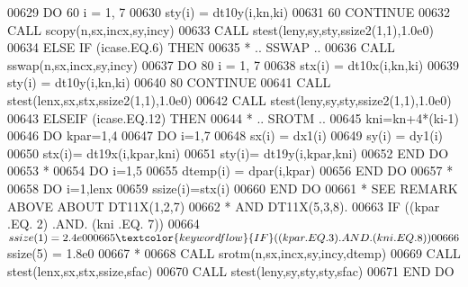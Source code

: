 \begin{DoxyCode}
00629                \textcolor{keywordflow}{DO} 60 i = 1, 7
00630                   sty(i) = dt10y(i,kn,ki)
00631    60          \textcolor{keywordflow}{CONTINUE}
00632                \textcolor{keyword}{CALL }scopy(n,sx,incx,sy,incy)
00633                \textcolor{keyword}{CALL }stest(leny,sy,sty,ssize2(1,1),1.0e0)
00634             \textcolor{keywordflow}{ELSE} \textcolor{keywordflow}{IF} (icase.EQ.6) \textcolor{keywordflow}{THEN}
00635 \textcolor{comment}{*              .. SSWAP ..}
00636                \textcolor{keyword}{CALL }sswap(n,sx,incx,sy,incy)
00637                \textcolor{keywordflow}{DO} 80 i = 1, 7
00638                   stx(i) = dt10x(i,kn,ki)
00639                   sty(i) = dt10y(i,kn,ki)
00640    80          \textcolor{keywordflow}{CONTINUE}
00641                \textcolor{keyword}{CALL }stest(lenx,sx,stx,ssize2(1,1),1.0e0)
00642                \textcolor{keyword}{CALL }stest(leny,sy,sty,ssize2(1,1),1.0e0)
00643             \textcolor{keywordflow}{ELSEIF} (icase.EQ.12) \textcolor{keywordflow}{THEN}
00644 \textcolor{comment}{*              .. SROTM ..}
00645                kni=kn+4*(ki-1)
00646                \textcolor{keywordflow}{DO} kpar=1,4
00647                   \textcolor{keywordflow}{DO} i=1,7
00648                      sx(i) = dx1(i)
00649                      sy(i) = dy1(i)
00650                      stx(i)= dt19x(i,kpar,kni)
00651                      sty(i)= dt19y(i,kpar,kni)
00652 \textcolor{keywordflow}{                  END DO}
00653 \textcolor{comment}{*}
00654                   \textcolor{keywordflow}{DO} i=1,5
00655                      dtemp(i) = dpar(i,kpar)
00656 \textcolor{keywordflow}{                  END DO}
00657 \textcolor{comment}{*}
00658                   \textcolor{keywordflow}{DO}  i=1,lenx
00659                      ssize(i)=stx(i)
00660 \textcolor{keywordflow}{                  END DO}
00661 \textcolor{comment}{*                   SEE REMARK ABOVE ABOUT DT11X(1,2,7)}
00662 \textcolor{comment}{*                       AND DT11X(5,3,8).}
00663                   \textcolor{keywordflow}{IF} ((kpar .EQ. 2) .AND. (kni .EQ. 7))
00664      $               ssize(1) = 2.4e0
00665                   \textcolor{keywordflow}{IF} ((kpar .EQ. 3) .AND. (kni .EQ. 8))
00666      $               ssize(5) = 1.8e0
00667 \textcolor{comment}{*}
00668                   \textcolor{keyword}{CALL   }srotm(n,sx,incx,sy,incy,dtemp)
00669                   \textcolor{keyword}{CALL   }stest(lenx,sx,stx,ssize,sfac)
00670                   \textcolor{keyword}{CALL   }stest(leny,sy,sty,sty,sfac)
00671 \textcolor{keywordflow}{               END DO}

\end{DoxyCode}
